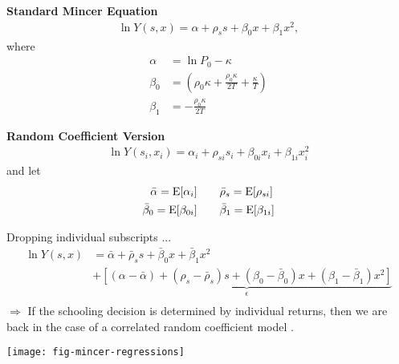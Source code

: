 \begin{frame}
\textbf{Standard Mincer Equation}
\begin{align*}
\ln Y(s, x) = \alpha + \rho_s s + \beta_0 x + \beta_1 x^2,
\end{align*}
where
\begin{align*}
\alpha & =\ln P_0 - \kappa \\
\beta_0 & = \left(\rho_0\kappa + \frac{\rho_0\kappa}{2T} + \frac{\kappa}{T}\right) \\
\beta_1 & = -\frac{\rho_0\kappa}{2T}
\end{align*}
\end{frame}

\begin{frame}
\textbf{Random Coefficient Version}
\begin{align*}
\ln Y(s_i, x_i) = \alpha_{i} + \rho_{si} s_i + \beta_{0i} x_i + \beta_{1i} x_i^2
\end{align*}
and let
\begin{align*}
\bar{\alpha} = \mathrm{E}[\alpha_i] &\qquad \bar{\rho}_s = \mathrm{E}[\rho_{si}]\\
\bar{\beta}_0 = \mathrm{E}[\beta_{0i}]&\qquad \bar{\beta}_1 = \mathrm{E}[\beta_{1i}]
\end{align*}
\end{frame}


\begin{frame}
Dropping individual subscripts ...
\begin{align*}
\ln Y(s, x) & = \bar{\alpha} + \bar{\rho}_s s + \bar{\beta}_{0} x + \bar{\beta}_{1} x^2 \\
                & + \underbrace{[(\alpha - \bar{\alpha}) + (\rho_s - \bar{\rho}_s) s + (\beta_0 - \bar{\beta}_0)x + (\beta_1 - \bar{\beta}_1)x^2 ]}_{\epsilon}\\
\end{align*}
$\Rightarrow$ If the schooling decision is determined by individual returns, then we are back in the case of a correlated random coefficient model \cite{Heckman.2006d}.
\end{frame}





\begin{frame}[plain]

\begin{center}
\texttt{[image: fig-mincer-regressions]}
\end{center}

\end{frame}

